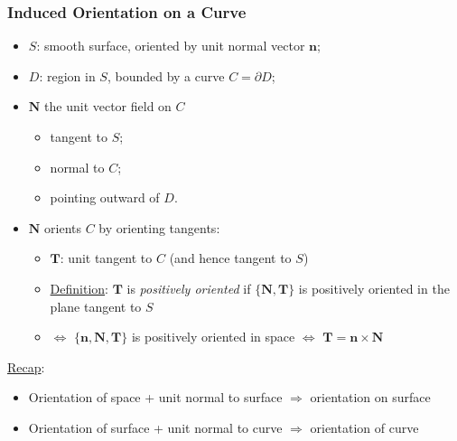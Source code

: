 \begin{frame}
  \frametitle{Induced Orientation on a Curve}
  \begin{itemize}
    \item $S$: smooth surface, oriented by unit normal vector $\textbf{n}$;
    \item $D$: region in $S$, bounded by a curve $C=\partial D$;
    \item $\textbf{N}$ the unit vector field on $C$
    \begin{itemize}
      \item tangent to $S$;
      \item normal to $C$;
      \item pointing outward of $D$.
    \end{itemize}
    \item \pause $\textbf{N}$ orients $C$ by orienting tangents:
    \begin{itemize}
      \item $\textbf{T}$: unit tangent to $C$ (and hence tangent to $S$)
      \item \underline{Definition}: $\textbf{T}$ is \emph{positively oriented} if $\{\textbf{N}, \textbf{T}\}$ is positively oriented in the plane tangent to $S$
      \item $\Longleftrightarrow$ $\{\textbf{n}, \textbf{N}, \textbf{T}\}$ is positively oriented in space $\Longleftrightarrow$ $\textbf{T}=\textbf{n}\times \textbf{N}$
    \end{itemize}
  \end{itemize}

\pause \underline{Recap}:
\begin{itemize}
  \item Orientation of space + unit normal to surface $\Longrightarrow$ orientation on surface
  \item Orientation of surface + unit normal to curve $\Longrightarrow$ orientation of curve
\end{itemize}
\end{frame}

